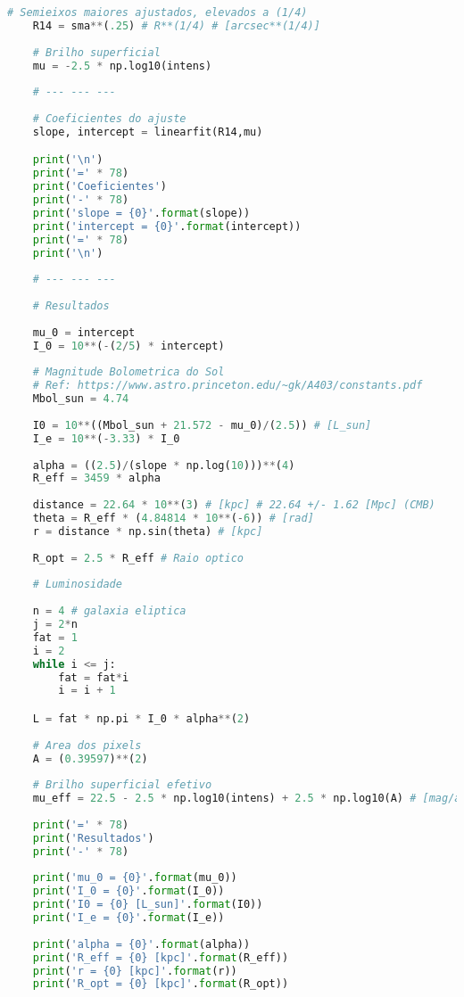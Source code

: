 \documentclass[a4paper, 11pt, fleqn, leqno]{article}
\begin{document}
{\begin{lstlisting}[language=Python]
    # Semieixos maiores ajustados, elevados a (1/4)
    R14 = sma**(.25) # R**(1/4) # [arcsec**(1/4)]
    
    # Brilho superficial
    mu = -2.5 * np.log10(intens)
    
    # --- --- ---
    
    # Coeficientes do ajuste
    slope, intercept = linearfit(R14,mu)

    print('\n')
    print('=' * 78)
    print('Coeficientes')
    print('-' * 78)
    print('slope = {0}'.format(slope))
    print('intercept = {0}'.format(intercept))
    print('=' * 78)
    print('\n')
    
    # --- --- ---
    
    # Resultados
    
    mu_0 = intercept
    I_0 = 10**(-(2/5) * intercept)
    
    # Magnitude Bolometrica do Sol
    # Ref: https://www.astro.princeton.edu/~gk/A403/constants.pdf
    Mbol_sun = 4.74
    
    I0 = 10**((Mbol_sun + 21.572 - mu_0)/(2.5)) # [L_sun]
    I_e = 10**(-3.33) * I_0
    
    alpha = ((2.5)/(slope * np.log(10)))**(4)
    R_eff = 3459 * alpha
    
    distance = 22.64 * 10**(3) # [kpc] # 22.64 +/- 1.62 [Mpc] (CMB)
    theta = R_eff * (4.84814 * 10**(-6)) # [rad]
    r = distance * np.sin(theta) # [kpc]
    
    R_opt = 2.5 * R_eff # Raio optico
    
    # Luminosidade
    
    n = 4 # galaxia eliptica
    j = 2*n
    fat = 1
    i = 2
    while i <= j:
        fat = fat*i
        i = i + 1

    L = fat * np.pi * I_0 * alpha**(2)
    
    # Area dos pixels
    A = (0.39597)**(2)
    
    # Brilho superficial efetivo
    mu_eff = 22.5 - 2.5 * np.log10(intens) + 2.5 * np.log10(A) # [mag/arcsec**2]
    
    print('=' * 78)
    print('Resultados')
    print('-' * 78)
    
    print('mu_0 = {0}'.format(mu_0))
    print('I_0 = {0}'.format(I_0))
    print('I0 = {0} [L_sun]'.format(I0))
    print('I_e = {0}'.format(I_e))
    
    print('alpha = {0}'.format(alpha))
    print('R_eff = {0} [kpc]'.format(R_eff))
    print('r = {0} [kpc]'.format(r))
    print('R_opt = {0} [kpc]'.format(R_opt))
    

\end{lstlisting}}
\end{document}
